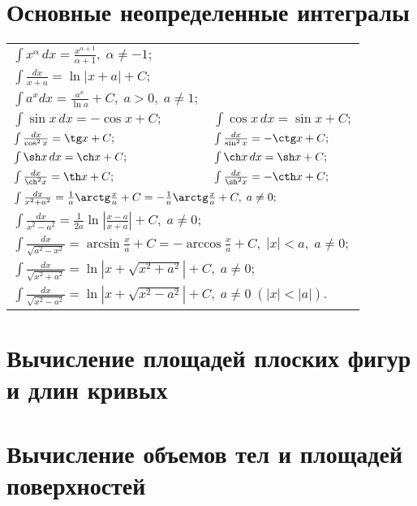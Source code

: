 \section{Основные неопределенные интегралы}
\begin{longtable}[l]{l l}
$\int x^\alpha \,dx = \frac{x^{\alpha+1}}{\alpha+1},\; \alpha\neq -1;$ & $ $ 
\\ $\int\frac{dx}{x+a} = \ln|x+a|+C;$ & $ $ 
\\ $\int a^x dx = \frac{a^x}{\ln a} + C, \; a>0,\; a\neq 1;$ & $ $ 
\\ $\int \sin x\,dx =-\cos x + C; $ 
& $\int \cos x \,dx = \sin x + C;$ 
\\ $\int \frac{dx}{\cos^2 x} = \tg x + C;$ 
& $\int \frac{dx}{\sin^2 x} = -\ctg x + C;$ 
\\ $\int \sh x \,dx = \ch x + C; $ 
& $\int \ch x \,dx = \sh x + C;$ 
\\ $\int \frac{dx}{\ch^2 x} = \th x + C; $ 
& $\int \frac{dx}{\sh^2 x} = -\cth x + C; $ 
\\ \multicolumn{2}{l}{$\int\frac{dx}{x^2+a^2} = \frac{1}{a}\arctg\frac{x}{a} + C = -\frac{1}{a}\arctg\frac{x}{a} + C,\; a\neq 0; $}
\\ \multicolumn{2}{l}{$\int\frac{dx}{x^2-a^2} = \frac{1}{2a}\ln\left|\frac{x-a}{x+a}\right| + C, \; a\neq 0 ;$ }
\\ \multicolumn{2}{l}{$\int\frac{dx}{\sqrt{a^2-x^2}} = \arcsin\frac{x}{a} + C=-\arccos\frac{x}{a} + C,\; |x|<a,\;a\neq 0;$}
\\ \multicolumn{2}{l}{$\int\frac{dx}{\sqrt{x^2+a^2}} = \ln|x+\sqrt{x^2+a^2}|+C,\; a\neq 0; $}
\\\multicolumn{2}{l}{$\int\frac{dx}{\sqrt{x^2-a^2}}= \ln|x+\sqrt{x^2-a^2}|+C,\; a\neq 0 \;(|x|<|a|). $}
\end{longtable}

\section{Вычисление площадей плоских фигур и длин кривых}



\section{Вычисление объемов тел и площадей поверхностей}

